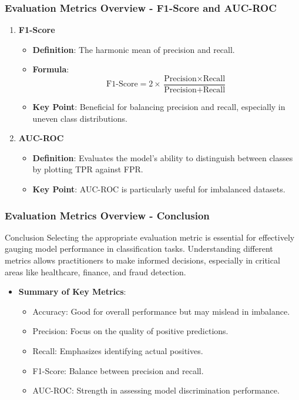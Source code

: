 \documentclass[aspectratio=169]{beamer}
\begin{document}
\begin{frame}[fragile]
  \frametitle{Evaluation Metrics Overview - F1-Score and AUC-ROC}
  \begin{enumerate}[resume]
    \item \textbf{F1-Score}
      \begin{itemize}
        \item \textbf{Definition}: The harmonic mean of precision and recall.
        \item \textbf{Formula}:
          \begin{equation}
          \text{F1-Score} = 2 \times \frac{\text{Precision} \times \text{Recall}}{\text{Precision} + \text{Recall}}
          \end{equation}
        \item \textbf{Key Point}: Beneficial for balancing precision and recall, especially in uneven class distributions.
      \end{itemize}
    
    \item \textbf{AUC-ROC}
      \begin{itemize}
        \item \textbf{Definition}: Evaluates the model's ability to distinguish between classes by plotting TPR against FPR.
        \item \textbf{Key Point}: AUC-ROC is particularly useful for imbalanced datasets.
      \end{itemize}
  \end{enumerate}
\end{frame}

\begin{frame}[fragile]
  \frametitle{Evaluation Metrics Overview - Conclusion}
  \begin{block}{Conclusion}
    Selecting the appropriate evaluation metric is essential for effectively gauging model performance in classification tasks. 
    Understanding different metrics allows practitioners to make informed decisions, especially in critical areas like healthcare, finance, and fraud detection.
  \end{block}
  
  \begin{itemize}
    \item \textbf{Summary of Key Metrics}:
      \begin{itemize}
        \item Accuracy: Good for overall performance but may mislead in imbalance.
        \item Precision: Focus on the quality of positive predictions.
        \item Recall: Emphasizes identifying actual positives.
        \item F1-Score: Balance between precision and recall.
        \item AUC-ROC: Strength in assessing model discrimination performance.
      \end{itemize}
  \end{itemize}
\end{frame}
\end{document}
